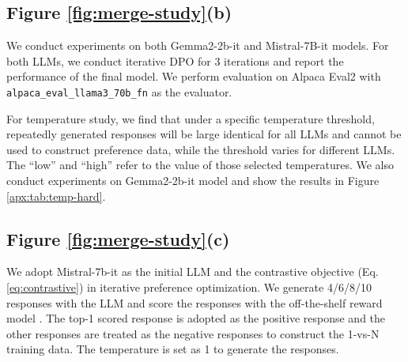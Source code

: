\subsection{Figure \ref{fig:merge-study}(b)}\label{apx:sec-hard-neg-setting-temp}

We conduct experiments on both Gemma2-2b-it and Mistral-7B-it models.
For both LLMs, we conduct iterative DPO for 3 iterations and report the performance of the final model.
We perform evaluation on Alpaca Eval2 with \texttt{alpaca\_eval\_llama3\_70b\_fn} as the evaluator.

For temperature study, we find that under a specific temperature threshold, repeatedly generated responses will be large identical for all LLMs and cannot be used to construct preference data, while the threshold varies for different LLMs.
The ``low'' and ``high'' refer to the value of those selected temperatures.
We also conduct experiments on Gemma2-2b-it model and show the results in Figure \ref{apx:tab:temp-hard}.


\subsection{Figure \ref{fig:merge-study}(c)}\label{apx:sec-length-setting}

We adopt Mistral-7b-it as the initial LLM and the contrastive objective (Eq. \ref{eq:contrastive}) in iterative preference optimization.
We generate 4/6/8/10 responses with the LLM and score the responses with the off-the-shelf reward model \citep{dong2024rlhf}.
The top-1 scored response is adopted as the positive response and the other responses are treated as the negative responses to construct the 1-vs-N training data.
The temperature is set as 1 to generate the responses.






